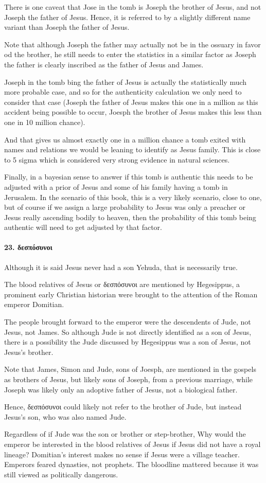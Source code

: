 There is one caveat that Jose in the tomb is Joseph the brother of Jesus, and not Joseph the father of Jesus.
Hence, it is referred to by a slightly different name variant than Joseph the father of Jesus.

Note that although Joseph the father may actually not be in the ossuary in favor od the brother, he still needs to enter the statistics in a similar factor as Joseph the father is clearly inscribed as the father of Jesus and James.

Joseph in the tomb bing the father of Jesus is actually the statistically much more probable case, and so for the authenticity calculation we only need to consider that case (Joseph the father of Jesus makes this one in a million as this accident being possible to occur, Joesph the brother of Jesus makes this less than one in 10 million chance).

And that gives us almost exactly one in a million chance a tomb exited with names and relations we would be leaning to identify as Jesus family.
This is close to 5 sigma which is considered very strong evidence in natural sciences.

Finally, in a bayesian sense to answer if this tomb is authentic this needs to be adjusted with a prior of Jesus and some of his family having a tomb in Jerusalem.
In the scenario of this book, this is a very likely scenario, close to one, but of course if we assign a large probability to Jesus was only a preacher or Jesus really ascending bodily to heaven, then the probability of this tomb being authentic will need to get adjusted by that factor.

\paragraph{23.
δεσπόσυνοι}\label{par:par:ux3b4ux3b5ux3c3ux3c0ux3ccux3c3ux3c5ux3bdux3bfux3b9}

Although it is said Jesus never had a son Yehuda, that is necessarily true.

The blood relatives of Jesus or δεσπόσυνοι are mentioned by Hegesippus, a prominent early Christian historian were brought to the attention of the Roman emperor Domitian.

The people brought forward to the emperor were the descendents of Jude, not Jesus, not James.
So although Jude is not directly identified as a son of Jesus, there is a possibility the Jude discussed by Hegesippus was a son of Jesus, not Jesus's brother.

Note that James, Simon and Jude, sons of Joesph, are mentioned in the gospels as brothers of Jesus, but likely sons of Joseph, from a previous marriage, while Joseph was likely only an adoptive father of Jesus, not a biological father.

Hence, δεσπόσυνοι could likely not refer to the brother of Jude, but instead Jesus's son, who was also named Jude.

Regardless of if Jude was the son or brother or step-brother, Why would the emperor be interested in the blood relatives of Jesus if Jesus did not have a royal lineage?
Domitian’s interest makes no sense if Jesus were a village teacher.
Emperors feared dynasties, not prophets.
The bloodline mattered because it was still viewed as politically dangerous.
